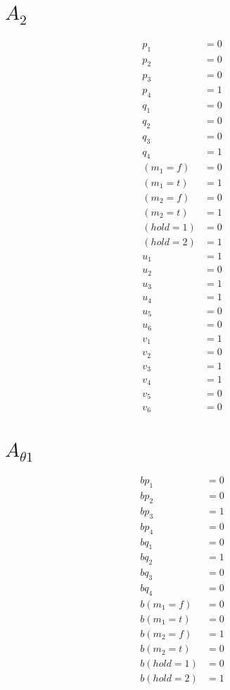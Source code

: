 \documentclass{scrartcl}
\begin{document}
\section{$A_2$}

\begin{align*}
  p_1 &= 0 \\
  p_2 &= 0 \\
  p_3 &= 0 \\
  p_4 &= 1 \\
  q_1 &= 0 \\
  q_2 &= 0 \\
  q_3 &= 0 \\
  q_4 &= 1 \\
  (m_1=f) &= 0 \\
  (m_1=t) &= 1 \\
  (m_2=f) &= 0 \\
  (m_2=t) &= 1 \\
  (hold=1) &= 0 \\
  (hold=2) &= 1 \\
  u_1 &= 1 \\
  u_2 &= 0 \\
  u_3 &= 1 \\
  u_4 &= 1 \\
  u_5 &= 0 \\
  u_6 &= 0 \\
  v_1 &= 1 \\
  v_2 &= 0 \\
  v_3 &= 1 \\
  v_4 &= 1 \\
  v_5 &= 0 \\
  v_6 &= 0
\end{align*}

\section{$A_{\theta 1}$}
\begin{align*}
  bp_1 &= 0 \\
  bp_2 &= 0 \\
  bp_3 &= 1 \\
  bp_4 &= 0 \\
  bq_1 &= 0 \\
  bq_2 &= 1 \\
  bq_3 &= 0 \\
  bq_4 &= 0 \\
  b(m_1=f) &= 0 \\
  b(m_1=t) &= 0 \\
  b(m_2=f) &= 1 \\
  b(m_2=t) &= 0 \\
  b(hold=1) &= 0 \\
  b(hold=2) &= 1
\end{align*}
\end{document}
